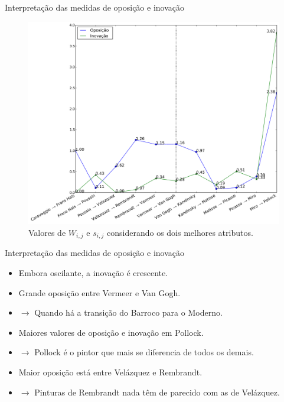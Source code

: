 \documentclass{beamer}
\begin{document}
\begin{frame}{Interpretação das medidas de oposição e inovação}
  \begin{figure}[h!]
\begin{center}
        \includegraphics[width=.7\textwidth]{figs/caso1_oposEinov}
         \caption{Valores de $W_{i,j}$ e $s_{i,j}$ considerando
        os dois melhores atributos.}
        \label{fig:caso1_oposEinov}
\end{center}
\end{figure}
\end{frame}

\begin{frame}{Interpretação das medidas de oposição e inovação}
      \begin{itemize}

  \item<1> Embora oscilante, a inovação é crescente.

  \item<2> Grande oposição entre Vermeer e Van Gogh.
  \item<2> $\to$ Quando há a transição do Barroco para o Moderno.

  \item<3> Maiores valores de oposição e inovação em Pollock.
  \item<3> $\to$ Pollock é o pintor que mais se diferencia de todos os demais.

  \item<4> Maior oposição está entre Velázquez e Rembrandt.
  \item<4> $\to$ Pinturas de Rembrandt nada têm de parecido com as de Velázquez.


  

    \end{itemize}
 \end{frame}
\end{document}
